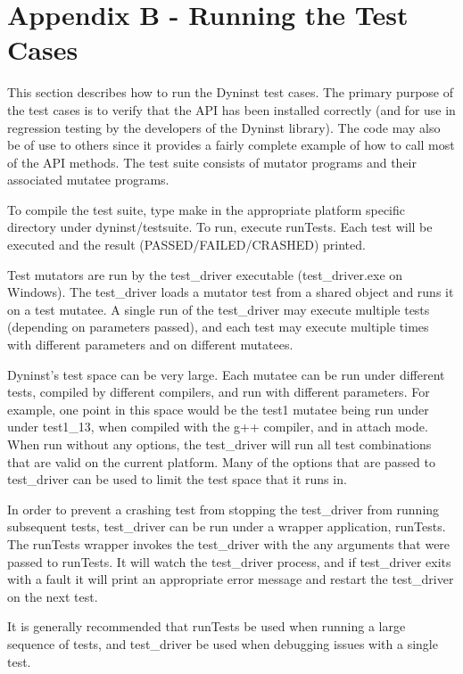 \section[Appendix B {}- Running the Test Cases]{Appendix B - Running the Test Cases}
{
This section describes how to run the Dyninst test cases. The primary purpose of the test cases is to verify that the
API has been installed correctly (and for use in regression testing by the developers of the Dyninst library). The
code may also be of use to others since it provides a fairly complete example of how to call most of the API methods.
The test suite consists of mutator programs and their associated mutatee programs.

{
To compile the test suite, type make in the appropriate platform specific directory under dyninst/testsuite. To run,
execute runTests. Each test will be executed and the result (PASSED/FAILED/CRASHED) printed.}

{
Test mutators are run by the test_driver executable (test_driver.exe on Windows). The test_driver loads a mutator
test from a shared object and runs it on a test mutatee. A single run of the test_driver may execute multiple tests
(depending on parameters passed), and each test may execute multiple times with different parameters and on different
mutatees.

{
Dyninst's test space can be very large. Each mutatee can be run under different tests, compiled
by different compilers, and run with different parameters. For example, one point in this space would be the test1
mutatee being run under under test1_13, when compiled with the g++ compiler, and in attach mode. When run without
any options, the test_driver will run all test combinations that are valid on the current platform. Many of the
options that are passed to test_driver can be used to limit the test space that it runs in.}

{
In order to prevent a crashing test from stopping the test_driver from running subsequent tests, test_driver can be
run under a wrapper application, runTests. The runTests wrapper invokes the test_driver with the any arguments that
were passed to runTests. It will watch the test_driver process, and if test_driver exits with a fault it will print
an appropriate error message and restart the test_driver on the next test.}

{
It is generally recommended that runTests be used when running a large sequence of tests, and test_driver be used when
debugging issues with a single test.}

}}

